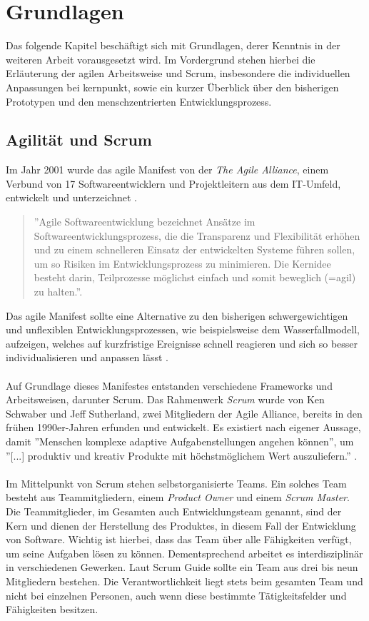 \chapter{Grundlagen}
\label{cha:Grundlagen}
Das folgende Kapitel beschäftigt sich mit Grundlagen, derer Kenntnis in der weiteren Arbeit vorausgesetzt wird. Im Vordergrund stehen hierbei die Erläuterung der agilen Arbeitsweise und Scrum, insbesondere die individuellen Anpassungen bei kernpunkt, sowie ein kurzer Überblick über den bisherigen Prototypen und den menschzentrierten Entwicklungsprozess.

\section{Agilität und Scrum}
\label{sec:agilitaet_scrum}
Im Jahr 2001 wurde das agile Manifest von der \textit{The Agile Alliance}, einem Verbund von 17 Softwareentwicklern und Projektleitern aus dem IT-Umfeld, entwickelt und unterzeichnet \cite{agilemanifestosignatories, agilemanifestohistory}. 
\begin{quote}
''Agile Softwareentwicklung bezeichnet Ansätze im Softwareentwicklungsprozess, die die Transparenz und Flexibilität erhöhen und zu einem schnelleren Einsatz der entwickelten Systeme führen sollen, um so Risiken im Entwicklungsprozess zu minimieren. Die Kernidee besteht darin, Teilprozesse möglichst einfach und somit beweglich (=agil) zu halten.''\cite{definitionagil}.
\end{quote}
Das agile Manifest sollte eine Alternative zu den bisherigen schwergewichtigen und unflexiblen Entwicklungsprozessen, wie beispielsweise dem Wasserfallmodell, aufzeigen, welches auf kurzfristige Ereignisse schnell reagieren und sich so besser individualisieren und anpassen lässt \cite{agilemanifestohistory}. \\ \\
Auf Grundlage dieses Manifestes entstanden verschiedene Frameworks und Arbeitsweisen, darunter Scrum. Das Rahmenwerk \textit{Scrum} wurde von Ken Schwaber und Jeff Sutherland, zwei Mitgliedern der Agile Alliance, bereits in den frühen 1990er-Jahren erfunden und entwickelt. Es existiert nach eigener Aussage, damit  ''Menschen komplexe adaptive Aufgabenstellungen angehen können'', um ''[...] produktiv und kreativ Produkte mit höchstmöglichem Wert auszuliefern.'' \cite{scrumguide}.
\\ \\
Im Mittelpunkt von Scrum stehen selbstorganisierte Teams. Ein solches Team besteht aus Teammitgliedern, einem \textit{Product Owner} und einem \textit{Scrum Master}. Die Teammitglieder, im Gesamten auch Entwicklungsteam genannt, sind der Kern und dienen der Herstellung des Produktes, in diesem Fall der Entwicklung von Software. Wichtig ist hierbei, dass das Team über alle Fähigkeiten verfügt, um seine Aufgaben lösen zu können. Dementsprechend arbeitet es interdisziplinär in verschiedenen Gewerken. Laut Scrum Guide sollte ein Team aus drei bis neun Mitgliedern bestehen. Die Verantwortlichkeit liegt stets beim gesamten Team und nicht bei einzelnen Personen, auch wenn diese bestimmte Tätigkeitsfelder und Fähigkeiten besitzen.
